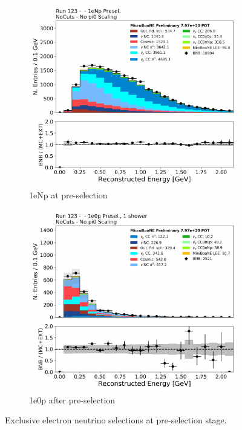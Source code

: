 \begin{figure}[H] 
\begin{center}
    \begin{subfigure}[b]{0.45\textwidth}
    \centering
    \includegraphics[width=1.00\textwidth]{Fakedata/set2/Np_presel_recoe.pdf}
    \caption{\label{fig:fakedata:set2:Np_presel_recoe} 1eNp at pre-selection}
    \end{subfigure}
    \begin{subfigure}[b]{0.45\textwidth}
    \centering
    \includegraphics[width=1.00\textwidth]{Fakedata/set2/zp_presel_recoe.pdf}
    \caption{\label{fig:fakedata:set2:2shr0p} 1e0p after pre-selection}
    \end{subfigure}
\caption{\label{fig:fakedata:set2:presel} Exclusive electron neutrino selections at pre-selection stage.}
\end{center}
\end{figure}

